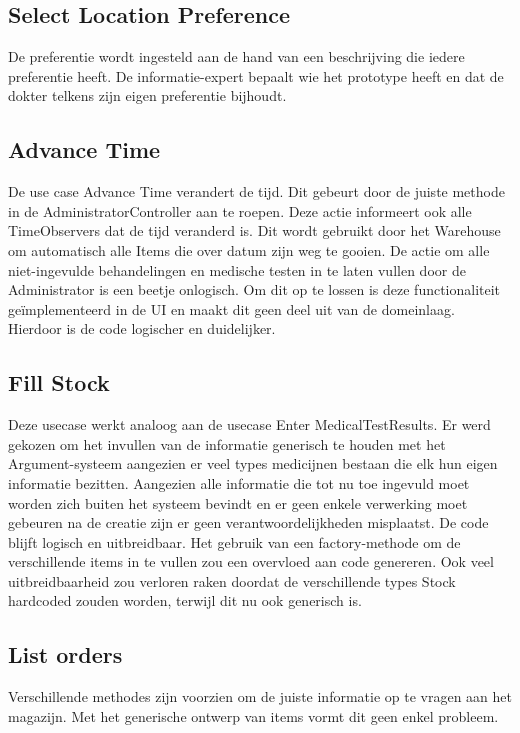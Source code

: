 \subsection{Select Location Preference}
De preferentie wordt ingesteld aan de hand van een beschrijving die iedere preferentie heeft. 
De informatie-expert bepaalt wie het prototype heeft en dat de dokter telkens zijn eigen preferentie bijhoudt.

\subsection{Advance Time}
De use case Advance Time verandert de tijd. Dit gebeurt door de juiste methode in de AdministratorController aan te roepen. 
Deze actie informeert ook alle TimeObservers dat de tijd veranderd is. Dit wordt gebruikt door het Warehouse om automatisch alle Items die over datum zijn weg te gooien. 
De actie om alle niet-ingevulde behandelingen en medische testen in te laten vullen door de Administrator is een beetje onlogisch. 
Om dit op te lossen is deze functionaliteit geïmplementeerd in de UI en maakt dit geen deel uit van de domeinlaag. 
Hierdoor is de code logischer en duidelijker.

\subsection{Fill Stock}
Deze usecase werkt analoog aan de usecase Enter MedicalTestResults. 
Er werd gekozen om het invullen van de informatie generisch te houden met het Argument-systeem aangezien er veel types medicijnen bestaan die elk hun eigen informatie bezitten. 
Aangezien alle informatie die tot nu toe ingevuld moet worden zich buiten het systeem bevindt en er geen enkele verwerking moet gebeuren na de creatie zijn er geen verantwoordelijkheden misplaatst.
De code blijft logisch en uitbreidbaar. Het gebruik van een factory-methode om de verschillende items in te vullen zou een overvloed aan code genereren. 
Ook veel uitbreidbaarheid zou verloren raken doordat de verschillende types Stock hardcoded zouden worden, terwijl dit nu ook generisch is.

\subsection{List orders}
Verschillende methodes zijn voorzien om de juiste informatie op te vragen aan het magazijn. Met het generische ontwerp van items vormt dit geen enkel probleem.

